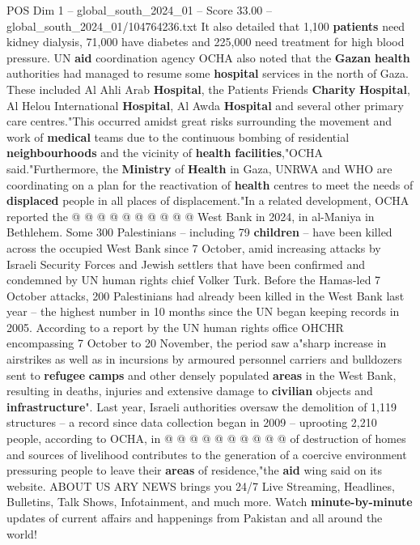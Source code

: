 \begin{textsample}{POS Dim 1 – global\_south\_2024\_01 – Score 33.00 – global\_south\_2024\_01/104764236.txt}
It also detailed that 1,100 \textbf{patients} need kidney dialysis, 71,000 have diabetes and 225,000 need treatment for high blood pressure.
UN \textbf{aid} coordination agency OCHA also noted that the \textbf{Gazan} \textbf{health} authorities had managed to resume some \textbf{hospital} services in the north of Gaza.
These included Al Ahli Arab \textbf{Hospital}, the Patients Friends \textbf{Charity} \textbf{Hospital}, Al Helou International \textbf{Hospital}, Al Awda \textbf{Hospital} and several other primary care centres."This occurred amidst great risks surrounding the movement and work of \textbf{medical} teams due to the continuous bombing of residential \textbf{neighbourhoods} and the vicinity of \textbf{health} \textbf{facilities},"OCHA said."Furthermore, the \textbf{Ministry} of \textbf{Health} in Gaza, UNRWA and WHO are coordinating on a plan for the reactivation of \textbf{health} centres to meet the needs of \textbf{displaced} people in all places of displacement."In a related development, OCHA reported the @ @ @ @ @ @ @ @ @ @ West Bank in 2024, in al-Maniya in Bethlehem.
Some 300 Palestinians -- including 79 \textbf{children} -- have been killed across the occupied West Bank since 7 October, amid increasing attacks by Israeli Security Forces and Jewish settlers that have been confirmed and condemned by UN human rights chief Volker Turk.
Before the Hamas-led 7 October attacks, 200 Palestinians had already been killed in the West Bank last year -- the highest number in 10 months since the UN began keeping records in 2005.
According to a report by the UN human rights office OHCHR encompassing 7 October to 20 November, the period saw a"sharp increase in airstrikes as well as in incursions by armoured personnel carriers and bulldozers sent to \textbf{refugee} \textbf{camps} and other densely populated \textbf{areas} in the West Bank, resulting in deaths, injuries and extensive damage to \textbf{civilian} objects and \textbf{infrastructure}".
Last year, Israeli authorities oversaw the demolition of 1,119 structures -- a record since data collection began in 2009 -- uprooting 2,210 people, according to OCHA, in @ @ @ @ @ @ @ @ @ @ of destruction of homes and sources of livelihood contributes to the generation of a coercive environment pressuring people to leave their \textbf{areas} of residence,"the \textbf{aid} wing said on its website.
ABOUT US ARY NEWS brings you 24/7 Live Streaming, Headlines, Bulletins, Talk Shows, Infotainment, and much more.
Watch \textbf{minute-by-minute} updates of current affairs and happenings from Pakistan and all around the world!

\end{textsample}
